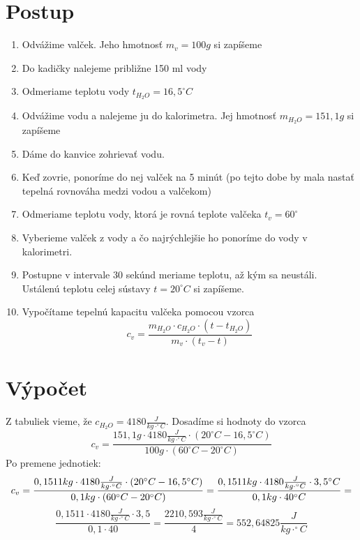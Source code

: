 \documentclass{article}
\begin{document}
\section{Postup}
\begin{enumerate}
\item Odvážime valček. Jeho hmotnosť $m_v = 100 g$ si zapíšeme
\item Do kadičky nalejeme približne 150 ml vody
\item Odmeriame teplotu vody $t_{H_2O} = 16,5 ^{\circ}C$
\item Odvážime vodu a nalejeme ju do kalorimetra. Jej hmotnosť $m_{H_2O} = 151,1 g$ si zapíšeme
\item Dáme do kanvice zohrievať vodu.
\item Keď zovrie, ponoríme do nej valček na 5 minút (po tejto dobe by mala  nastať tepelná rovnováha medzi vodou a valčekom)
\item Odmeriame teplotu vody, ktorá je rovná teplote valčeka $t_v = 60 ^{\circ}$
\item Vyberieme valček z vody a čo najrýchlejšie ho ponoríme do vody v kalorimetri.
\item Postupne v intervale 30 sekúnd meriame teplotu, až kým sa neustáli. Ustálenú teplotu celej sústavy $t=20 ^{\circ}C$ si zapíšeme.
\item Vypočítame tepelnú kapacitu valčeka pomocou vzorca 
	\[
		c_v = \frac {m_{H_2O} \cdot c_{H_2O} \cdot ( t - t_{H_2O})} {m_v \cdot (t_v - t)}
	\]
\end{enumerate}
\section{Výpočet}
Z tabuliek vieme, že $c_{H_2O} = 4180 \frac{J}{kg\cdot ^{\circ} C}$.
Dosadíme si hodnoty do vzorca 
\[
	c_v = \frac {151,1 g \cdot 4180 \frac{J}{kg\cdot ^{\circ} C} \cdot (20 ^{\circ}C - 16,5 ^{\circ}C)}{100 g \cdot ( 60 ^{\circ}C - 20 ^{\circ}C)}
\]
Po premene jednotiek:
$$
	c_v =  \frac {0,1511 kg \cdot 4180 \frac{J}{kg\cdot ^{\circ} C} \cdot (20 ^{\circ}C - 16,5 ^{\circ}C)}{0,1 kg \cdot ( 60 ^{\circ}C - 20 ^{\circ}C)} = \\
	\frac {0,1511 kg \cdot 4180 \frac{J}{kg\cdot ^{\circ} C} \cdot 3,5 ^{\circ}C}{0,1 kg \cdot 40^{\circ}C} =$$$$
	\frac {0,1511 \cdot 4180 \frac{J}{kg\cdot ^{\circ} C} \cdot 3,5}{0,1  \cdot 40 } = \frac {2210,593 \frac{J}{kg\cdot ^{\circ} C}} {4} = 552,64825 \frac{J}{kg\cdot ^{\circ} C}
$$
\end{document}
